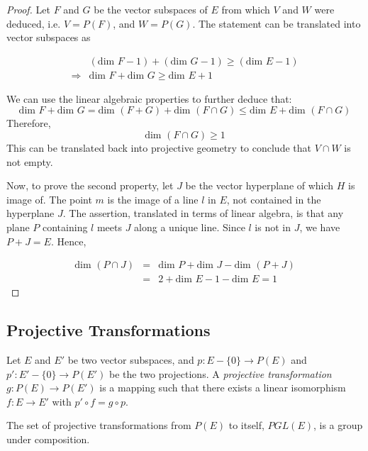 \begin{proof}
  Let $F$ and $G$ be the vector subspaces of $E$ from which $V$ and $W$ were deduced, i.e.
  $V=P(F)$, and $W=P(G)$. The statement can be translated into vector subspaces as

  \begin{eqnarray*}
    & (\text{dim }F-1)+(\text{dim }G-1)\ge(\text{dim }E-1)\\
    \Longrightarrow& \text{dim }F+\text{dim }G\ge\text{dim }E+1
  \end{eqnarray*}

  We can use the linear algebraic properties to further deduce that:
  \[
    \text{dim }F+\text{dim }G=\text{dim }(F+G)+\text{dim }(F\cap G)
    \le\text{dim }E+\text{dim }(F\cap G)
  \]
  Therefore,
  \[
    \text{dim }(F\cap G)\ge1
  \]
  This can be translated back into projective geometry to conclude that $V\cap W$ is not empty.

  Now, to prove the second property, let $J$ be the vector hyperplane of which $H$ is image of.
  The point $m$ is the image of a line $l$ in $E$, not contained in the hyperplane $J$.
  The assertion, translated in terms of linear algebra, is that any plane $P$ containing $l$
  meets $J$ along a unique line. Since $l$ is not in $J$, we have $P+J=E$. Hence,

  \begin{eqnarray*}
    \text{dim }(P\cap J) &=& \text{dim }P+\text{dim }J-\text{dim }(P+J)\\
    &=& 2+\text{dim }E-1-\text{dim }E=1
  \end{eqnarray*}
\end{proof}

\subsection{Projective Transformations}

\begin{definition}
  Let $E$ and $E'$ be two vector subspaces, and $p:E-\{0\}\rightarrow P(E)$ and
  $p':E'-\{0\}\rightarrow P(E')$ be the two projections. A \textit{projective transformation}
  $g:P(E)\rightarrow P(E')$ is a mapping such that there exists a linear isomorphism
  $f:E\rightarrow E'$ with $p'\circ f=g\circ p$.
\end{definition}

\begin{prop}
  The set of projective transformations from $P(E)$ to itself, $PGL(E)$, is a group under
  composition.
\end{prop}

